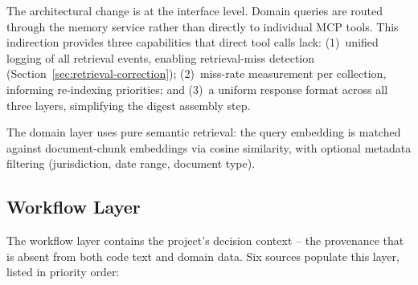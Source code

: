 \documentclass[11pt]{article}
\begin{document}
The architectural change is at the interface level.
Domain queries are routed through the memory service rather than directly to individual MCP tools.
This indirection provides three capabilities that direct tool calls lack: (1)~unified logging of all retrieval events, enabling retrieval-miss detection (Section~\ref{sec:retrieval-correction}); (2)~miss-rate measurement per collection, informing re-indexing priorities; and (3)~a uniform response format across all three layers, simplifying the digest assembly step.

The domain layer uses pure semantic retrieval: the query embedding is matched against document-chunk embeddings via cosine similarity, with optional metadata filtering (jurisdiction, date range, document type).

\subsection{Workflow Layer}
\label{sec:workflow-layer}

The workflow layer contains the project's decision context -- the provenance that is absent from both code text and domain data.
Six sources populate this layer, listed in priority order:
\end{document}
